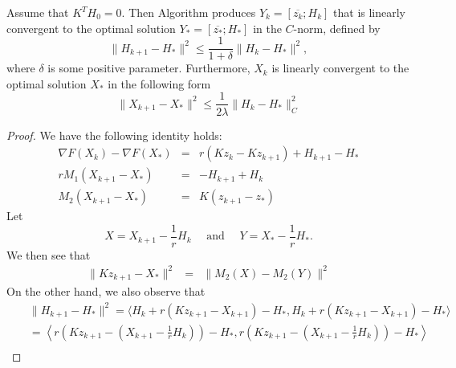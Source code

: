 \begin{theorem}
Assume that $K^TH_0 = 0$. Then Algorithm produces 
$Y_k = [\overline{z_k}; H_k]$ that is linearly convergent to the optimal solution  $Y_* = [\overline{z_*}; H_*]$ in the $C$-norm, defined by 
\begin{equation}
\|H_{k+1} - H_* \|^2 \leq \frac{1}{1+\delta} \| H_{k} - H_*\|^2,
\end{equation}
where $\delta$ is some positive parameter. Furthermore, $X_k$ is linearly convergent to the optimal solution $X_*$ in the following form
\begin{equation}
\|X_{k+1} - X_* \|^2 \leq \frac{1}{2 \lambda} \|H_{k} - H_* \|^2_C
\end{equation}
\end{theorem}

\begin{proof}
We have the following identity holds: 
\begin{eqnarray*}
\nabla F(X_{k}) - \nabla F(X_*) &=& r( K z_{k} - K {z_{k+1}}) + H_{k+1} - H_* \\
r M_1 (X_{k+1} - X_*) &=& - H_{k+1} + H_k \\
M_2 (X_{k+1} - X_*) &=& K(z_{k+1} - z_*)
\end{eqnarray*}
Let 
\begin{equation}
X = X_{k+1} - \frac{1}{r}H_k \quad \mbox{ and } \quad Y = X_* - \frac{1}{r}H_*. 
\end{equation}
We then see that 
\begin{eqnarray*}
\|Kz_{k+1} - X_* \|^2 &=& \|M_2(X) - M_2(Y)\|^2%
\end{eqnarray*}
On the other hand, we also observe that
\begin{eqnarray*}
&& \|H_{k+1} - H_* \|^2 = \langle H_{k} + r (Kz_{k+1} - X_{k+1}) - H_*, H_{k} + r (Kz_{k+1} - X_{k+1}) - H_* \rangle \\ 
&& = \left \langle r \left( Kz_{k+1} - \left ( X_{k+1} - \frac{1}{r} H_k \right ) \right ) - H_*, r \left( Kz_{k+1} - \left ( X_{k+1} - \frac{1}{r} H_k \right ) \right ) - H_* \right \rangle \\

\end{eqnarray*}
\end{proof}
